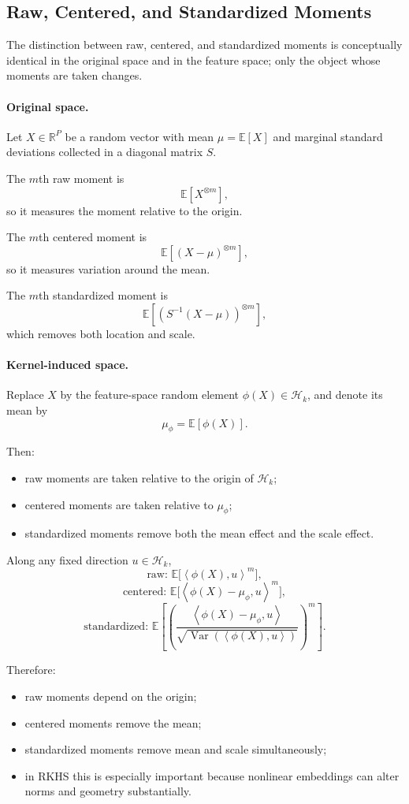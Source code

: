 \documentclass[11pt]{article}
\newcommand{\R}{\mathbb{R}}
\newcommand{\E}{\mathbb{E}}
\newcommand{\Var}{\operatorname{Var}}
\newcommand{\inner}[2]{\left\langle #1, #2 \right\rangle}
\begin{document}
\subsection{Raw, Centered, and Standardized Moments}

The distinction between raw, centered, and standardized moments is conceptually identical in the original space and in the feature space; only the object whose moments are taken changes.

\paragraph{Original space.}
Let $X \in \R^P$ be a random vector with mean $\mu = \E[X]$ and marginal standard deviations collected in a diagonal matrix $S$.

The $m$th raw moment is
\[
\E[X^{\otimes m}],
\]
so it measures the moment relative to the origin.

The $m$th centered moment is
\[
\E[(X-\mu)^{\otimes m}],
\]
so it measures variation around the mean.

The $m$th standardized moment is
\[
\E\left[\left(S^{-1}(X-\mu)\right)^{\otimes m}\right],
\]
which removes both location and scale.

\paragraph{Kernel-induced space.}
Replace $X$ by the feature-space random element $\phi(X) \in \mathcal{H}_k$, and denote its mean by
\[
\mu_\phi = \E[\phi(X)].
\]

Then:
\begin{itemize}
\item raw moments are taken relative to the origin of $\mathcal{H}_k$;
\item centered moments are taken relative to $\mu_\phi$;
\item standardized moments remove both the mean effect and the scale effect.
\end{itemize}

Along any fixed direction $u \in \mathcal{H}_k$,
\[
\text{raw: }
\E\bigl[\inner{\phi(X)}{u}^m\bigr],
\]
\[
\text{centered: }
\E\bigl[\inner{\phi(X)-\mu_\phi}{u}^m\bigr],
\]
\[
\text{standardized: }
\E\left[
\left(
\frac{\inner{\phi(X)-\mu_\phi}{u}}
{\sqrt{\Var(\inner{\phi(X)}{u})}}
\right)^m
\right].
\]

Therefore:
\begin{itemize}
\item raw moments depend on the origin;
\item centered moments remove the mean;
\item standardized moments remove mean and scale simultaneously;
\item in RKHS this is especially important because nonlinear embeddings can alter norms and geometry substantially.
\end{itemize}
\end{document}
